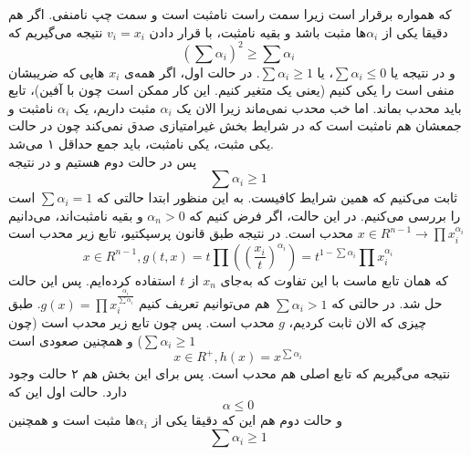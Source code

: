 \begin{enumerate}
که همواره برقرار است زیرا سمت راست نامثبت است و سمت چپ نامنفی.
اگر هم دقیقا یکی از 
$\alpha_i$‌ها
مثبت باشد و بقیه نامثبت، با قرار دادن 
$v_i=x_i$
نتیجه می‌گیریم که 
\[
(\sum \alpha_i)^2 \ge \sum \alpha_i
\]
و در نتیجه یا 
$\sum \alpha_i \le 0$،
یا 
$\sum \alpha_i \ge 1$.
در حالت اول، اگر همه‌ی
$x_i$
‌هایی که ضریبشان منفی است را یکی کنیم (یعنی یک متغیر کنیم. این کار ممکن است چون  با آفین)،
تابع باید محدب بماند. اما خب محدب نمی‌ماند زیرا الان یک 
$\alpha_i$
مثبت داریم، یک 
$\alpha_i$
نامثبت و جمعشان هم نامثبت است که در شرایط بخش غیرامتیازی صدق نمی‌کند چون در حالت یکی مثبت، یکی نامثبت، باید جمع حداقل ۱ می‌شد.\\
پس در حالت دوم هستیم و در نتیجه 
\[
\sum \alpha_i \ge 1
\]
ثابت می‌کنیم که همین شرایط کافیست. به این منظور ابتدا حالتی که 
$\sum \alpha_i = 1$
است را بررسی می‌کنیم. در این حالت، اگر فرض کنیم که 
$\alpha_n > 0$
و بقیه‌ نامثبت‌اند، می‌دانیم
$x \in R^{n - 1} \to \prod x_i^{\alpha_i}$
محدب است. در نتیجه طبق قانون پرسپکتیو، تابع زیر محدب است
\[
x \in R^{n - 1}, g(t, x) = t\prod((\frac{x_i}{t})^{\alpha_i}) = t^{1 - \sum \alpha_i} \prod x_i^{\alpha_i}
\]
که همان تابع ماست با این تفاوت که به‌جای
$x_n$
از $t$ استفاده کرده‌ایم. پس این حالت حل شد. در حالتی که 
$\sum \alpha_i > 1$
هم می‌توانیم تعریف کنیم
$g(x) = \prod x_i^{\frac{\alpha_i}{\sum \alpha_i}}$.
طبق چیزی که الان ثابت کردیم، 
$g$ محدب است.
پس چون تابع زیر محدب است (چون $\sum \alpha_i \ge 1$) و همچنین صعودی است
\[
x \in R^+, h(x) = x^{\sum \alpha_i}
\]
نتیجه می‌گیریم که تابع اصلی هم محدب است. پس برای این بخش هم ۲ حالت وجود دارد.
حالت اول این که 
\[
\alpha \le 0
\]
و حالت دوم هم این که دقیقا یکی از $\alpha_i$‌ها مثبت است و همچنین
\[
\sum \alpha_i \ge 1
\]
\end{enumerate}